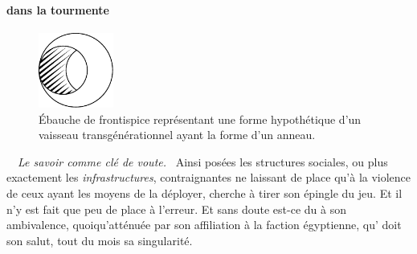 \paragraph{\elena{} dans la tourmente}
\begin{figure}
	\vspace{-1em}
	\centering
	\includegraphics[width=0.22\textwidth]{frontispice-arche-evidee.pdf}
	\caption{Ébauche de frontispice représentant une forme hypothétique d’un vaisseau transgénérationnel ayant la forme d’un anneau.}
	\vspace{-10pt}
\end{figure}
\
\
{\em\normalsize Le savoir comme clé de voute.}~
Ainsi posées les structures sociales, ou plus exactement les \emph{infrastructures}, contraignantes ne laissant de place qu’à la violence de ceux ayant les moyens de la déployer, \elena{} cherche à tirer son épingle du jeu.
Et il n’y est fait que peu de place à l’erreur. Et sans doute est-ce du à son ambivalence, quoiqu’atténuée par son affiliation à la faction égyptienne, qu’\elena{}  doit son salut, tout du mois sa singularité.


